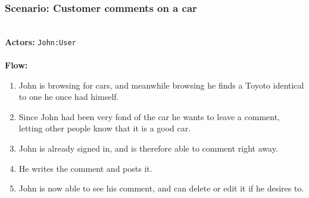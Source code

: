 \subsubsection{Scenario: Customer comments on a car}
\HRule \\[0.4cm]
\textbf{Actors:} \texttt{John:User}\\
\HRule \\[0.4cm]
\textbf{Flow:} \\
\begin{enumerate}
\item John is browsing for cars, and meanwhile browsing he finds a Toyoto identical to one he once had himself.
\item Since John had been very fond of the car he wants to leave a comment, letting other people know that it is a good car.
\item John is already signed in, and is therefore able to comment right away.
\item He writes the comment and posts it.
\item John is now able to see his comment, and can delete or edit it if he desires to.
\end{enumerate}
\HRule \\[0.4cm]
